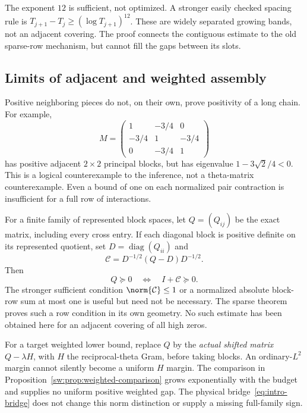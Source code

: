 \documentclass[11pt,a4paper]{article}
\numberwithin{equation}{section}
\theoremstyle{definition}\newtheorem{definition}[theorem]{Definition}
\theoremstyle{remark}\newtheorem{remark}[theorem]{Remark}
\begin{document}
The exponent $12$ is sufficient, not optimized. A stronger easily checked spacing rule is $T_{j+1}-T_j\ge(\log T_{j+1})^{12}$. These are widely separated growing bands, not an adjacent covering. The proof connects the contiguous estimate to the old sparse-row mechanism, but cannot fill the gaps between its slots.

\subsection{Limits of adjacent and weighted assembly}\label{bl:sec:limits}
Positive neighboring pieces do not, on their own, prove positivity of a long chain. For example,
\begin{equation}\label{bl:counterexample}
 M=\begin{pmatrix}1&-3/4&0\\-3/4&1&-3/4\\0&-3/4&1\end{pmatrix}
\end{equation}
has positive adjacent $2\times2$ principal blocks, but has eigenvalue $1-3\sqrt2/4<0$. This is a logical counterexample to the inference, not a theta-matrix counterexample. Even a bound of one on each normalized pair contraction is insufficient for a full row of interactions.

For a finite family of represented block spaces, let $Q=(Q_{ij})$ be the exact matrix, including every cross entry. If each diagonal block is positive definite on its represented quotient, set $D=\operatorname{diag}(Q_{ii})$ and
\begin{equation}
 \mathcal C=D^{-1/2}(Q-D)D^{-1/2}.
\end{equation}
Then
\begin{equation}\label{bl:global-condition}
 Q\succeq0\quad\Longleftrightarrow\quad I+\mathcal C\succeq0.
\end{equation}
The stronger sufficient condition $\norm{\mathcal C}\le1$ or a normalized absolute block-row sum at most one is useful but need not be necessary. The sparse theorem proves such a row condition in its own geometry. No such estimate has been obtained here for an adjacent covering of all high zeros.

For a target weighted lower bound, replace $Q$ by the \emph{actual shifted matrix} $Q-\lambda H$, with $H$ the reciprocal-theta Gram, before taking blocks. An ordinary-$L^2$ margin cannot silently become a uniform $H$ margin. The comparison in Proposition~\ref{sw:prop:weighted-comparison} grows exponentially with the budget and supplies no uniform positive weighted gap. The physical bridge~\eqref{eq:intro-bridge} does not change this norm distinction or supply a missing full-family sign.
\end{document}
